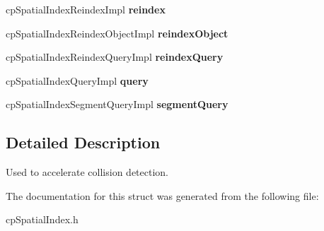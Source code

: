 \begin{DoxyCompactItemize}
\item 
\hypertarget{structcp_spatial_index_class_acd833dc0dd2f73e703a5c4263bbf4655}{}cp\+Spatial\+Index\+Reindex\+Impl {\bfseries reindex}\label{structcp_spatial_index_class_acd833dc0dd2f73e703a5c4263bbf4655}

\item 
\hypertarget{structcp_spatial_index_class_ae727936ae5fdcb723c9aea0577083bf6}{}cp\+Spatial\+Index\+Reindex\+Object\+Impl {\bfseries reindex\+Object}\label{structcp_spatial_index_class_ae727936ae5fdcb723c9aea0577083bf6}

\item 
\hypertarget{structcp_spatial_index_class_a60088d6e38cafcba2fde0c41086be83a}{}cp\+Spatial\+Index\+Reindex\+Query\+Impl {\bfseries reindex\+Query}\label{structcp_spatial_index_class_a60088d6e38cafcba2fde0c41086be83a}

\item 
\hypertarget{structcp_spatial_index_class_a92ef2e203e2f5162ce7d673a6d538377}{}cp\+Spatial\+Index\+Query\+Impl {\bfseries query}\label{structcp_spatial_index_class_a92ef2e203e2f5162ce7d673a6d538377}

\item 
\hypertarget{structcp_spatial_index_class_a02bf5963d4fdba46b3ecaa689b24d5cd}{}cp\+Spatial\+Index\+Segment\+Query\+Impl {\bfseries segment\+Query}\label{structcp_spatial_index_class_a02bf5963d4fdba46b3ecaa689b24d5cd}

\end{DoxyCompactItemize}


\subsection{Detailed Description}
Used to accelerate collision detection. 

The documentation for this struct was generated from the following file\+:\begin{DoxyCompactItemize}
\item 
cp\+Spatial\+Index.\+h\end{DoxyCompactItemize}
